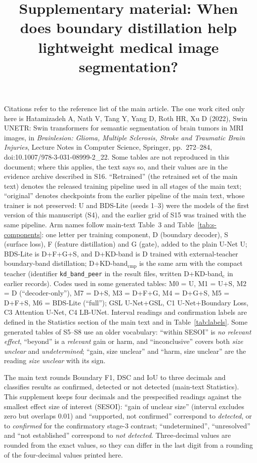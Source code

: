 \documentclass[10pt]{article}
\title{Supplementary material: When does boundary distillation help lightweight medical image segmentation?}
\date{}
\begin{document}
\maketitle
\noindent Citations refer to the reference list of the main article. The one work cited only here is Hatamizadeh A, Nath V, Tang Y, Yang D, Roth HR, Xu D (2022), Swin UNETR: Swin transformers for semantic segmentation of brain tumors in MRI images, in \emph{Brainlesion: Glioma, Multiple Sclerosis, Stroke and Traumatic Brain Injuries}, Lecture Notes in Computer Science, Springer, pp.~272--284, doi:10.1007/978-3-031-08999-2\_22. Some tables are not reproduced in this document; where this applies, the text says so, and their values are in the evidence archive described in S16. ``Retrained'' (the retrained set of the main text) denotes the released training pipeline used in all stages of the main text; ``original'' denotes checkpoints from the earlier pipeline of the main text, whose trainer is not preserved: U and BDS-Lite (seeds 1--3) were the models of the first version of this manuscript (S4), and the earlier grid of S15 was trained with the same pipeline. Arm names follow main-text Table~3 and Table~\ref{tab:s-components}: one letter per training component, D (boundary decoder), S (surface loss), F (feature distillation) and G (gate), added to the plain U-Net U; BDS-Lite is D+F+G+S, and D+KD-band is D trained with external-teacher boundary-band distillation; D+KD-band$_{\mathrm{cmp}}$ is the same arm with the compact teacher (identifier \texttt{kd\_band\_peer} in the result files, written D+KD-band$_{\mathrm{c}}$ in earlier records). Codes used in some generated tables: M0 = U, M1 = U+S, M2 = D (``decoder-only''), M7 = D+S, M3 = D+F+G, M4 = D+G+S, M5 = D+F+S, M6 = BDS-Lite (``full''); GSL U-Net+GSL, C1 U-Net+Boundary Loss, C3 Attention U-Net, C4 LB-UNet. Interval readings and confirmation labels are defined in the Statistics section of the main text and in Table~\ref{tab:labels}. Some generated tables of S5--S8 use an older vocabulary: ``within SESOI'' is \emph{no relevant effect}, ``beyond'' is a \emph{relevant} gain or harm, and ``inconclusive'' covers both \emph{size unclear} and \emph{undetermined}; ``gain, size unclear'' and ``harm, size unclear'' are the reading \emph{size unclear} with its sign.

The main text rounds Boundary F1, DSC and IoU to three decimals and classifies results as confirmed, detected or not detected (main-text Statistics). This supplement keeps four decimals and the prespecified readings against the smallest effect size of interest (SESOI): ``gain of unclear size'' (interval excludes zero but overlaps 0.01) and ``supported, not confirmed'' correspond to \emph{detected}, or to \emph{confirmed} for the confirmatory stage-3 contrast; ``undetermined'', ``unresolved'' and ``not established'' correspond to \emph{not detected}. Three-decimal values are rounded from the exact values, so they can differ in the last digit from a rounding of the four-decimal values printed here.
\end{document}
